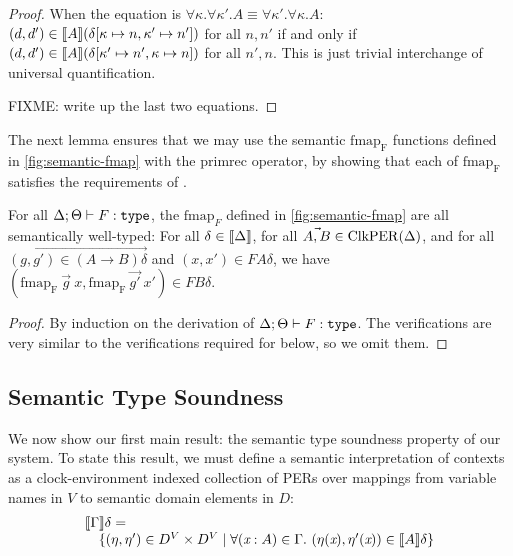 \begin{proof}
  When the equation is $\forall \kappa. \forall \kappa'. A \equiv
  \forall \kappa'. \forall \kappa. A$: $(d,d') \in
  \llbracket A \rrbracket(\delta[\kappa \mapsto n, \kappa' \mapsto n'])$ for all
  $n,n'$ if and only if $(d,d') \in \llbracket A \rrbracket(\delta[\kappa' \mapsto n',
  \kappa \mapsto n])$ for all $n',n$. This is just trivial interchange
  of universal quantification.

  FIXME: write up the last two equations.
\end{proof}

The next lemma ensures that we may use the semantic $\mathrm{fmap_F}$
functions defined in \autoref{fig:semantic-fmap} with the
$\mathrm{primrec}$ operator, by showing that each of $\mathrm{fmap_F}$
satisfies the requirements of .

\begin{lemma}\label{lem:sem-fmap-well-typed}
  For all $\Delta; \Theta \vdash F : \texttt{type}$, the $\mathrm{fmap}_F$
  defined in \autoref{fig:semantic-fmap} are all semantically
  well-typed: For all $\delta \in \llbracket \Delta \rrbracket$, for all $\vec{A,B}
  \in \mathrm{ClkPER}(\Delta)$, and for all $\vec{(g,g') \in (A \to B)\delta}$
  and $(x,x') \in FA\delta$, we have $(\mathrm{fmap_F}\ \vec{g}\ x,
  \mathrm{fmap_F}\ \vec{g'}\ x') \in FB\delta$.
\end{lemma}

\begin{proof}
  By induction on the derivation of $\Delta; \Theta \vdash F :
  \texttt{type}$. The verifications are very similar to the verifications
  required for  below, so we omit them.
\end{proof}

\subsection{Semantic Type Soundness}\label{sec:semantic-soundness}

We now show our first main result: the semantic type soundness
property of our system. To state this result, we must define a
semantic interpretation of contexts as a clock-environment indexed
collection of PERs over mappings from variable names in $V$ to
semantic domain elements in $D$:
\begin{displaymath}
  \begin{array}{l}
    \llbracket \Gamma \rrbracket\delta =\\
    \quad\{(\eta, \eta') \in D^V \times D^V \mathrel| \forall (\textit{x} : A) \in \Gamma.\ (\eta(\textit{x}), \eta'(\textit{x})) \in \llbracket A \rrbracket\delta \}  
  \end{array}
\end{displaymath}

